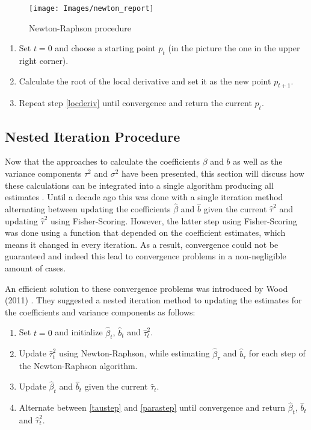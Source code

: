 \documentclass[12pt]{article}
\begin{document}
\begin{figure}[t]
\begin{center}
\texttt{[image: Images/newton\_report]}
\end{center}
\vspace{-2em}
\caption[caption]{Newton-Raphson procedure}\label{newton}
\end{figure}

\begin{enumerate}
\item Set $t=0$ and choose a starting point $p_t$ (in the picture the one in the upper right corner).
\item Calculate the root of the local derivative and set it as the new point $p_{t+1}$.\label{locderiv}
\item Repeat step \ref{locderiv} until convergence and return the current $p_t$.
\end{enumerate}






\subsection{Nested Iteration Procedure}\label{nested}

Now that the approaches to calculate the coefficients $\beta$ and $b$ as well as the variance components $\tau^2$ and $\sigma^2$ have been presented, this section will discuss how these calculations can be integrated into a single algorithm producing all estimates \cite{wood2011fast}. Until a decade ago this was done with a single iteration method alternating between updating the coefficients $\hat{\beta}$ and $\hat{b}$ given the current $\hat{\tau}^2$ and updating $\hat{\tau}^2$ using Fisher-Scoring. However, the latter step using Fisher-Scoring was done using a function that depended on the coefficient estimates, which means it changed in every iteration. As a result, convergence could not be guaranteed and indeed this lead to convergence problems in a non-negligible amount of cases.

An efficient solution to these convergence problems was introduced by Wood (2011) \cite{wood2011fast}. They suggested a nested iteration method to updating the estimates for the coefficients and variance components as follows:



\begin{enumerate}
\item Set $t=0$ and initialize $\hat{\beta}_t$, $\hat{b}_t$ and $\hat{\tau}^2_t$.
\item Update $\hat{\tau}^2_t$ using Newton-Raphson, while estimating $\hat{\beta}_{\tau}$ and $\hat{b}_\tau$ for each step of the Newton-Raphson algorithm. \label{taustep}
\item Update $\hat{\beta}_t$ and $\hat{b}_t$ given the current $\hat{\tau}_t$.\label{parastep}
\item Alternate between \ref{taustep} and \ref{parastep} until convergence and return $\hat{\beta}_t$, $\hat{b}_t$ and $\hat{\tau}^2_t$.
\end{enumerate}
\end{document}
